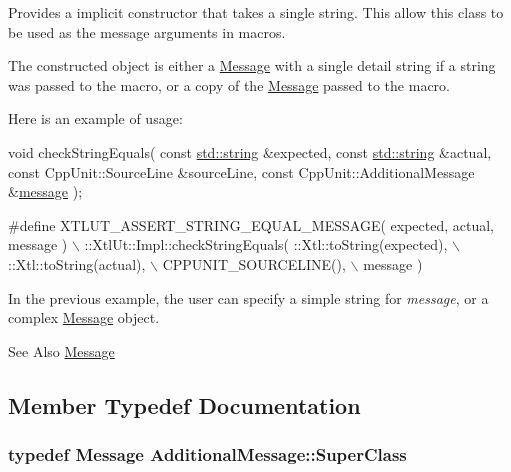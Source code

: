 Provides a implicit constructor that takes a single string. This allow this class to be used as the message arguments in macros. 

The constructed object is either a \hyperlink{class_message}{Message} with a single detail string if a string was passed to the macro, or a copy of the \hyperlink{class_message}{Message} passed to the macro.

Here is an example of usage\-: 
\begin{DoxyCode}
\textcolor{keywordtype}{void} checkStringEquals( \textcolor{keyword}{const} \hyperlink{glew_8h_ae84541b4f3d8e1ea24ec0f466a8c568b}{std::string} &expected,
                       \textcolor{keyword}{const} \hyperlink{glew_8h_ae84541b4f3d8e1ea24ec0f466a8c568b}{std::string} &actual,
                        \textcolor{keyword}{const} CppUnit::SourceLine &sourceLine,
                        \textcolor{keyword}{const} CppUnit::AdditionalMessage &\hyperlink{glew_8h_a76333d9470ffdd4811326932394d36da}{message} );

\textcolor{preprocessor}{#define XTLUT\_ASSERT\_STRING\_EQUAL\_MESSAGE( expected, actual, message )  \(\backslash\)}
\textcolor{preprocessor}{  ::XtlUt::Impl::checkStringEquals( ::Xtl::toString(expected),        \(\backslash\)}
\textcolor{preprocessor}{                                    ::Xtl::toString(actual),          \(\backslash\)}
\textcolor{preprocessor}{                                    CPPUNIT\_SOURCELINE(),             \(\backslash\)}
\textcolor{preprocessor}{                                    message )}
\end{DoxyCode}


In the previous example, the user can specify a simple string for {\itshape message}, or a complex \hyperlink{class_message}{Message} object.

\begin{DoxySeeAlso}{See Also}
\hyperlink{class_message}{Message} 
\end{DoxySeeAlso}


\subsection{Member Typedef Documentation}
\hypertarget{class_additional_message_abc8626e28c147b5ddd66032a35676126}{
\subsubsection[{Super\-Class}]{\setlength{\rightskip}{0pt plus 5cm}typedef {\bf Message} {\bf Additional\-Message\-::\-Super\-Class}}}\label{class_additional_message_abc8626e28c147b5ddd66032a35676126}


